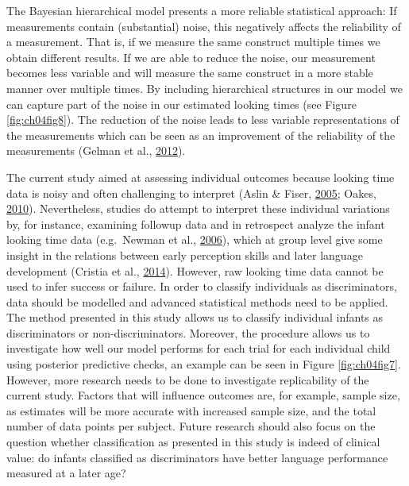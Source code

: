 \documentclass[openright,titlepage,12pt,a4paper]{book}
\begin{document}
The Bayesian hierarchical model presents a more reliable statistical approach: If measurements contain (substantial) noise, this negatively affects the reliability of a measurement. That is, if we measure the same construct multiple times we obtain different results. If we are able to reduce the noise, our measurement becomes less variable and will measure the same construct in a more stable manner over multiple times. By including hierarchical structures in our model we can capture part of the noise in our estimated looking times (see Figure \ref{fig:ch04fig8}). The reduction of the noise leads to less variable representations of the measurements which can be seen as an improvement of the reliability of the measurements (Gelman et al., \protect\hyperlink{ref-gelman_why_2012}{2012}).

The current study aimed at assessing individual outcomes because looking time data is noisy and often challenging to interpret (Aslin \& Fiser, \protect\hyperlink{ref-aslin_methodological_2005}{2005}; Oakes, \protect\hyperlink{ref-oakes_using_2010}{2010}). Nevertheless, studies do attempt to interpret these individual variations by, for instance, examining followup data and in retrospect analyze the infant looking time data (e.g.~Newman et al., \protect\hyperlink{ref-newman_infants_2006}{2006}), which at group level give some insight in the relations between early perception skills and later language development (Cristia et al., \protect\hyperlink{ref-cristia_predicting_2014}{2014}). However, raw looking time data cannot be used to infer success or failure. In order to classify individuals as discriminators, data should be modelled and advanced statistical methods need to be applied. The method presented in this study allows us to classify individual infants as discriminators or non-discriminators. Moreover, the procedure allows us to investigate how well our model performs for each trial for each individual child using posterior predictive checks, an example can be seen in Figure \ref{fig:ch04fig7}. However, more research needs to be done to investigate replicability of the current study. Factors that will influence outcomes are, for example, sample size, as estimates will be more accurate with increased sample size, and the total number of data points per subject. Future research should also focus on the question whether classification as presented in this study is
indeed of clinical value: do infants classified as discriminators have better language performance measured at a later age?
\end{document}
